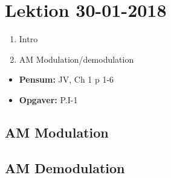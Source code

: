 \section{Lektion 30-01-2018}

\begin{enumerate}
	\item Intro
	\item AM Modulation/demodulation
\end{enumerate}

\begin{mdframed}[style=exampledefault]
	\begin{itemize}
		\item \textbf{Pensum:} JV, Ch 1 p 1-6
		\item \textbf{Opgaver:} P.I-1
	\end{itemize}
\end{mdframed}

\subsection{AM Modulation}

\subsection{AM Demodulation}
